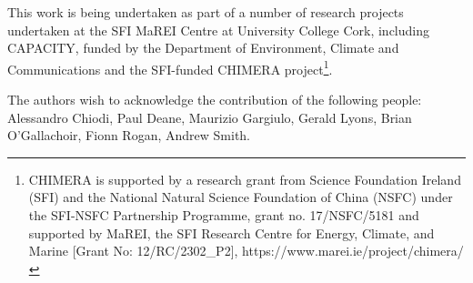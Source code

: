 \documentclass[journal abbreviation, manuscript]{copernicus}
\begin{document}
\begin{acknowledgements}
This work is being undertaken as part of a number of research projects undertaken at the SFI MaREI Centre at University College Cork, including CAPACITY, funded by the Department of Environment, Climate and Communications and the SFI-funded CHIMERA project\footnote{CHIMERA is supported by a research grant from Science Foundation Ireland (SFI) and the National Natural Science Foundation of China (NSFC) under the SFI-NSFC Partnership Programme, grant no. 17/NSFC/5181 and supported by MaREI, the SFI Research Centre for Energy, Climate, and Marine [Grant No: 12/RC/2302\_P2], https://www.marei.ie/project/chimera/}.

The authors wish to acknowledge the contribution of the following people: Alessandro Chiodi, Paul Deane, Maurizio Gargiulo, Gerald Lyons, Brian O'Gallachoir, Fionn Rogan, Andrew Smith.
\end{acknowledgements}















\end{document}
